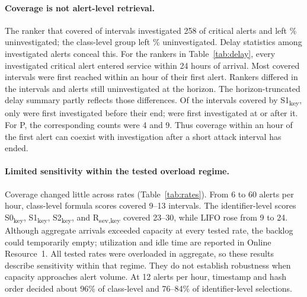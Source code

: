 \documentclass[pdflatex,sn-basic,Numbered]{sn-jnl}
\newcommand{\key}{\textsubscript{key}}
\newcommand{\Rsev}{R\textsubscript{sev,key}}
\begin{document}
\paragraph{Coverage is not alert-level retrieval.} The ranker that covered \ReplaySOneKeyCovered{} of \NCriticalIntervals{} intervals investigated 258 of \NCriticalAlerts{} critical alerts and left \ReplaySOneKeyStarvedShare\% uninvestigated; the class-level group left \ReplayClassStarvedShare\% uninvestigated. Delay statistics among investigated alerts conceal this. For the rankers in Table~\ref{tab:delay}, every investigated critical alert entered service within 24 hours of arrival. Most covered intervals were first reached within an hour of their first alert. Rankers differed in the intervals and alerts still uninvestigated at the horizon. The horizon-truncated delay summary partly reflects those differences. Of the \ReplaySOneKeyCovered{} intervals covered by S1\key, only \RevisionBeforeSOneKey{} were first investigated before their end; \RevisionLateSOneKey{} were first investigated at or after it. For P, the corresponding counts were 4 and 9. Thus coverage within an hour of the first alert can coexist with investigation after a short attack interval has ended.

\begin{tableorg}[t]
\centering
\caption{Delay and coverage at 12 alerts per hour. The origin is the first alert inside each interval. Median delay is the median across scenarios of within-scenario medians among covered intervals. The median scenario mean lower-bound delay averages four interval delays within each scenario, substituting horizon minus origin for an uncovered interval, then reports the median of those eight means. Within 1 h counts covered intervals whose first qualifying investigation starts at most one hour after that origin. Horizons differ across scenarios; this is not a pooled restricted mean at a common follow-up time.}
\label{tab:delay}
\small
\unskip
\end{tableorg}

\paragraph{Limited sensitivity within the tested overload regime.} Coverage changed little across rates (Table~\ref{tab:rates}). From 6 to 60 alerts per hour, class-level formula scores covered 9--13 intervals. The identifier-level scores S0\key, S1\key, S2\key, and \Rsev{} covered 23--30, while LIFO rose from 9 to 24. Although aggregate arrivals exceeded capacity at every tested rate, the backlog could temporarily empty; utilization and idle time are reported in Online Resource~1. All tested rates were overloaded in aggregate, so these results describe sensitivity within that regime. They do not establish robustness when capacity approaches alert volume. At 12 alerts per hour, timestamp and hash order decided about 96\% of class-level and 76--84\% of identifier-level selections.
\end{document}
